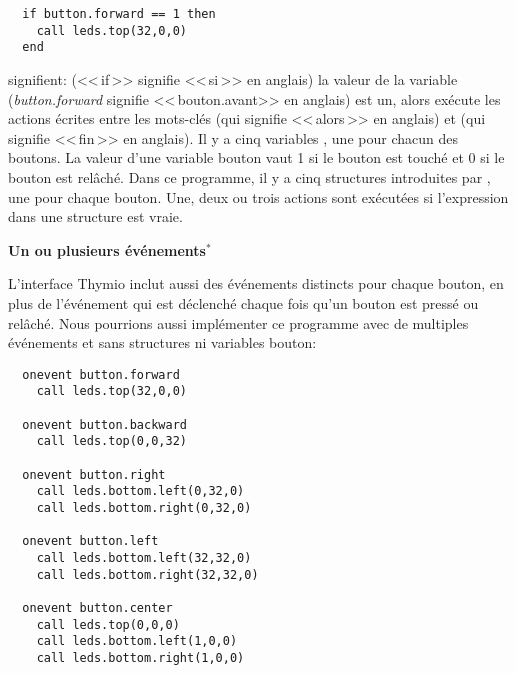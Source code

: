 \begin{footnotesize}
\begin{verbatim}
  if button.forward == 1 then
    call leds.top(32,0,0)
  end
\end{verbatim}
\end{footnotesize}

signifient:  (<<\,if\,>> signifie <<\,si\,>> en anglais) la valeur de la variable  (\emph{button.forward} signifie
<<\,bouton.avant>> en anglais) est un,
alors exécute les actions écrites entre les mots-clés  (qui signifie <<\,alors\,>> en anglais)
et  (qui signifie <<\,fin\,>> en anglais).
Il y a cinq variables , une pour chacun des boutons.
La valeur d'une variable bouton vaut 1 si le bouton est touché et 0 si le bouton est relâché.
Dans ce programme, il y a cinq structures introduites par , une pour chaque bouton.
Une, deux ou trois actions sont exécutées si l'expression dans une structure  est vraie.


\textbf{\large Un ou plusieurs événements$^*$}

L'interface Thymio inclut aussi des événements distincts pour chaque bouton,
en plus de l'événement  qui est déclenché chaque fois qu'un bouton est pressé ou relâché.
Nous pourrions aussi implémenter ce programme avec de multiples événements et sans structures
 ni variables bouton:

\begin{footnotesize}
\begin{verbatim}
  onevent button.forward
    call leds.top(32,0,0)
  
  onevent button.backward
    call leds.top(0,0,32)
  
  onevent button.right
    call leds.bottom.left(0,32,0)
    call leds.bottom.right(0,32,0)
  
  onevent button.left
    call leds.bottom.left(32,32,0)
    call leds.bottom.right(32,32,0)
  
  onevent button.center
    call leds.top(0,0,0)
    call leds.bottom.left(1,0,0)
    call leds.bottom.right(1,0,0)
\end{verbatim}
\end{footnotesize}

